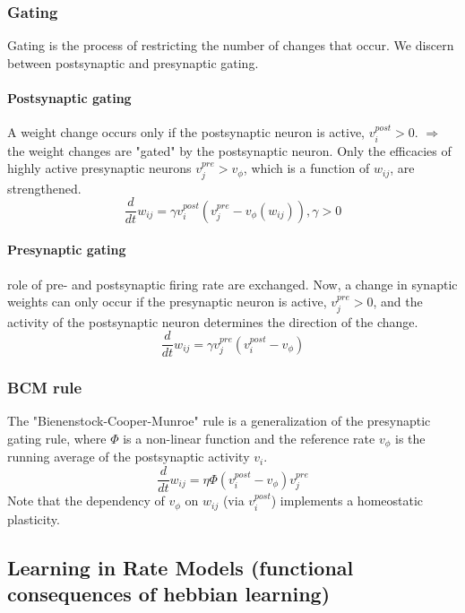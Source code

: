 \documentclass[11pt]{article}
\begin{document}
\subsubsection{Gating}
Gating is the process of restricting the number of changes that occur. We discern between postsynaptic and presynaptic gating.
\paragraph{Postsynaptic gating} A weight change occurs only if the postsynaptic neuron is active, $v_i^{post}>0$. $\Rightarrow$ the weight changes are "gated" by the postsynaptic neuron. Only the efficacies of highly active presynaptic neurons $v_j^{pre}>v_{\phi}$, which is a function of $w_{ij}$, are strengthened.
\[
\frac{d}{dt}w_{ij}=\gamma v_i^{post}(v_j^{pre}-v_{\phi}(w_{ij})), \gamma>0
\]
\paragraph{Presynaptic gating} role of pre- and postsynaptic firing rate are exchanged. Now, a change in synaptic weights can only occur if the presynaptic neuron is active, $v_j^{pre}>0$, and the activity of the postsynaptic neuron determines the direction of the change.
\[
\frac{d}{dt}w_{ij}=\gamma v_j^{pre}(v_i^{post}-v_{\phi})
\]

\subsubsection{BCM rule}
The "Bienenstock-Cooper-Munroe" rule is a generalization of the presynaptic gating rule, where $\Phi$ is a non-linear function and the reference rate $v_\phi$ is the running average of the postsynaptic activity $v_i$. 
\[
\frac{d}{dt}w_{ij}=\eta \Phi(v_i^{post}-v_{\phi})v_j^{pre}
\]
Note that the dependency of $v_\phi$ on $w_{ij}$ (via $v_i^{post}$) implements a homeostatic plasticity.
\subsection{Learning in Rate Models (functional consequences of hebbian learning)}
\end{document}
